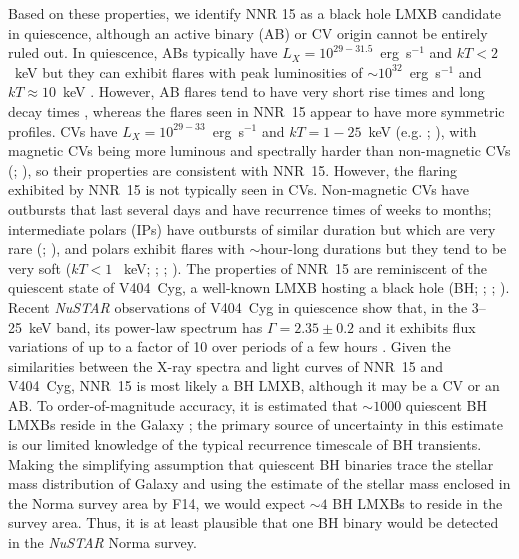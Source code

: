 \documentclass[iop,revtex4]{emulateapj}
\begin{document}
Based on these properties, we identify NNR 15 as a black hole LMXB candidate in quiescence, although an active binary (AB) or CV origin cannot be entirely ruled out.  In quiescence, ABs typically have $L_X=10^{29-31.5}$~erg~s$^{-1}$ and $kT<2$~keV \citep{dempsey93} but they can exhibit flares with peak luminosities of $\sim10^{32}$~erg~s$^{-1}$ and $kT\approx10$~keV \citep{franciosini01}.  However, AB flares tend to have very short rise times and long decay times \citep{pandey12}, whereas the flares seen in NNR~15 appear to have more symmetric profiles.  CVs have $L_X=10^{29-33}$~erg~s$^{-1}$ and $kT=1-25$~keV (e.g. \citealt{eracleous91}; \citealt{muno04}), with magnetic CVs being more luminous and spectrally harder than non-magnetic CVs (\citealt{barlow06}; \citealt{landi09}), so their properties are consistent with NNR~15.  However, the flaring exhibited by NNR~15 is not typically seen in CVs.  Non-magnetic CVs have outbursts that last several days and have recurrence times of weeks to months; intermediate polars (IPs) have outbursts of similar duration but which are very rare (\citealt{hellier97}; \citealt{szkody02}), and polars exhibit flares with $\sim$hour-long durations but they tend to be very soft ($kT<1$~ keV; \citealt{choi99}; \citealt{still01}; \citealt{traulsen10}).  The properties of NNR~15 are reminiscent of the quiescent state of V404~Cyg, a well-known LMXB hosting a black hole (BH; \citealt{makino89}; \citealt{casares92}; \citealt{shahbaz96}).  Recent \textit{NuSTAR} observations of V404~Cyg in quiescence show that, in the 3--25~keV band, its power-law spectrum has $\Gamma=2.35\pm0.2$ and it exhibits flux variations of up to a factor of 10 over periods of a few hours \citep{rana16}.  Given the similarities between the X-ray spectra and light curves of NNR~15 and V404~Cyg, NNR~15 is most likely a BH LMXB, although it may be a CV or an AB.  To order-of-magnitude accuracy, it is estimated that $\sim1000$ quiescent BH LMXBs reside in the Galaxy \citep{tanaka96}; the primary source of uncertainty in this estimate is our limited knowledge of the typical recurrence timescale of BH transients.  Making the simplifying assumption that quiescent BH binaries trace the stellar mass distribution of Galaxy and using the estimate of the stellar mass enclosed in the Norma survey area by F14, we would expect $\sim4$ BH LMXBs to reside in the survey area.  Thus, it is at least plausible that one BH binary would be detected in the \textit{NuSTAR} Norma survey.

\end{document}
